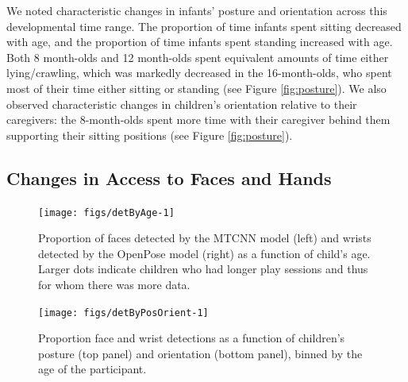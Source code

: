 \documentclass[10pt, letterpaper]{article}
\newenvironment{CodeChunk}{}{}
\begin{document}
We noted characteristic changes in infants' posture and orientation
across this developmental time range. The proportion of time infants
spent sitting decreased with age, and the proportion of time infants
spent standing increased with age. Both 8 month-olds and 12 month-olds
spent equivalent amounts of time either lying/crawling, which was
markedly decreased in the 16-month-olds, who spent most of their time
either sitting or standing (see Figure \ref{fig:posture}). We also
observed characteristic changes in children's orientation relative to
their caregivers: the 8-month-olds spent more time with their caregiver
behind them supporting their sitting positions (see Figure
\ref{fig:posture}).

\subsection{Changes in Access to Faces and
Hands}\label{changes-in-access-to-faces-and-hands}

\begin{CodeChunk}
\begin{figure}[h]

{\centering \texttt{[image: figs/detByAge-1]} 

}

\caption[Proportion of faces detected by the MTCNN model (left) and wrists detected by the OpenPose model (right) as a function of child's age]{Proportion of faces detected by the MTCNN model (left) and wrists detected by the OpenPose model (right) as a function of child's age. Larger dots indicate children who had longer play sessions and thus for whom there was more data.}\label{fig:detByAge}
\end{figure}
\end{CodeChunk}\begin{CodeChunk}
\begin{figure}[h]

{\centering \texttt{[image: figs/detByPosOrient-1]} 

}

\caption[Proportion face and wrist detections as a function of children's posture (top panel) and orientation (bottom panel), binned by the age of the participant]{Proportion face and wrist detections as a function of children's posture (top panel) and orientation (bottom panel), binned by the age of the participant.}\label{fig:detByPosOrient}
\end{figure}
\end{CodeChunk}
\end{document}

